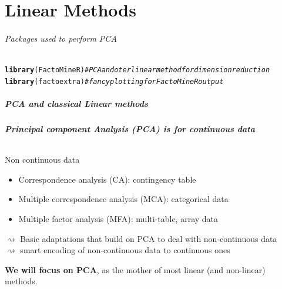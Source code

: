 \documentclass{beamer}\usepackage[]{graphicx}\usepackage[]{color}
\makeatletter
\newcommand{\hlcom}[1]{\textcolor[rgb]{0.678,0.584,0.686}{\textit{#1}}}%
\newcommand{\hlstd}[1]{\textcolor[rgb]{0.345,0.345,0.345}{#1}}%
\newcommand{\hlkwd}[1]{\textcolor[rgb]{0.737,0.353,0.396}{\textbf{#1}}}%
\newenvironment{kframe}{%
 \def\at@end@of@kframe{}%
 \ifinner\ifhmode%
  \def\at@end@of@kframe{\end{minipage}}%
  \begin{minipage}{\columnwidth}%
 \fi\fi%
 \def\FrameCommand##1{\hskip\@totalleftmargin \hskip-\fboxsep
 \colorbox{shadecolor}{##1}\hskip-\fboxsep
     \hskip-\linewidth \hskip-\@totalleftmargin \hskip\columnwidth}%
 \MakeFramed {\advance\hsize-\width
   \@totalleftmargin\z@ \linewidth\hsize
   \@setminipage}}%
 {\par\unskip\endMakeFramed%
 \at@end@of@kframe}
\newenvironment{knitrout}{}{} %
\makeatother
\begin{document}
\part{Linear Methods}
\begin{frame}[fragile]
  \partpage

\paragraph{Packages used to perform PCA}

\begin{knitrout}\scriptsize
{}\color{fgcolor}\begin{kframe}
\begin{alltt}
\hlkwd{library}\hlstd{(FactoMineR)} \hlcom{# PCA and oter linear method for dimension reduction}
\hlkwd{library}\hlstd{(factoextra)} \hlcom{# fancy plotting for FactoMineR output}
\end{alltt}
\end{kframe}
\end{knitrout}


\end{frame}


\begin{frame}
  \frametitle{PCA and classical Linear methods}
  
  \paragraph{\bf Principal component Analysis (PCA) is for continuous data}

  \begin{block}{Non continuous data}
  \begin{itemize}
    \item Correspondence analysis (CA): contingency table \medskip
    \item Multiple correspondence analysis (MCA): categorical data \medskip
    \item Multiple factor analysis (MFA): multi-table, array data 
  \end{itemize}
  $\rightsquigarrow$ Basic \alert{adaptations that build on PCA} to deal with non-continuous data\\
  $\rightsquigarrow$ smart encoding of non-continuous data to continuous ones
  \end{block}

  \vfill
  
  \begin{center}
    \alert{\bf We will focus on PCA}, as the mother of most linear (and non-linear) methods.
  \end{center}
  
\end{frame}
\end{document}
